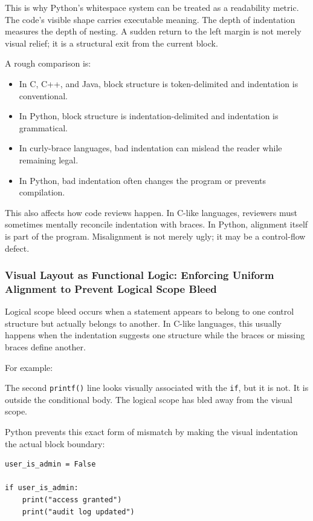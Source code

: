 This is why Python's whitespace system can be treated as a readability metric. The code's visible shape carries executable meaning. The depth of indentation measures the depth of nesting. A sudden return to the left margin is not merely visual relief; it is a structural exit from the current block.

A rough comparison is:

\begin{itemize}
    \item In C, C++, and Java, block structure is token-delimited and indentation is conventional.
    \item In Python, block structure is indentation-delimited and indentation is grammatical.
    \item In curly-brace languages, bad indentation can mislead the reader while remaining legal.
    \item In Python, bad indentation often changes the program or prevents compilation.
\end{itemize}

This also affects how code reviews happen. In C-like languages, reviewers must sometimes mentally reconcile indentation with braces. In Python, alignment itself is part of the program. Misalignment is not merely ugly; it may be a control-flow defect.

\subsubsection{Visual Layout as Functional Logic: Enforcing Uniform Alignment to Prevent Logical Scope Bleed}

Logical scope bleed occurs when a statement appears to belong to one control structure but actually belongs to another. In C-like languages, this usually happens when the indentation suggests one structure while the braces or missing braces define another.

For example:

The second \texttt{printf()} line looks visually associated with the \texttt{if}, but it is not. It is outside the conditional body. The logical scope has bled away from the visual scope.

Python prevents this exact form of mismatch by making the visual indentation the actual block boundary:

\begin{verbatim}
user_is_admin = False

if user_is_admin:
    print("access granted")
    print("audit log updated")
\end{verbatim}

